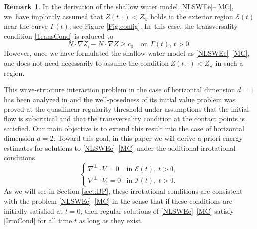 \documentclass[JEP,XML,SOM,Unicode,NoFloatCountersInSection,published]{cedram}
\newcommand{\cI}{{\mathcal I}}
\newcommand{\cE}{{\mathcal E}}
\newcommand{\itGamma}{\mathit{\Gamma}}
\theoremstyle{definition}
\newtheorem{remark}[theorem]{Remark}
\begin{document}
\begin{remark}
In the derivation of the shallow water model \eqref{NLSWEe}--\eqref{MC}, we~have implicitly assumed that $Z(t,\cdot)<Z_\mathrm{w}$ holds in the exterior region
$\cE(t)$ near the curve $\itGamma(t)$; see Figure \ref{Fig:config}. In~this case, the transversality condition \eqref{TransCond} is reduced to
\[
N\cdot\nabla Z_\mathrm{i}-N\cdot\nabla Z \geq c_0 \quad\text{on } \itGamma(t), \ t>0.
\]
However, once we have formulated the shallow water model as \eqref{NLSWEe}--\eqref{MC},
one does not need necessarily to assume the condition $Z(t,\cdot)<Z_\mathrm{w}$ in such a region.
\end{remark}

This wave-structure interaction problem in the case of horizontal dimension $d=1$ has been analyzed in \cite{IguchiLannes2021} and
the well-posedness of its initial value problem was proved at the quasilinear regularity threshold under assumptions that
the initial flow is subcritical and that the transversality condition at the contact points is satisfied.
Our main objective is to extend this result into the case of horizontal dimension $d=2$.
Toward this goal, in this paper we will derive a priori energy estimates for solutions to \eqref{NLSWEe}--\eqref{MC} under the additional irrotational conditions
\begin{equation}\label{IrroCond}
\begin{cases}
\nabla^\perp\cdot V=0 &\text{in } \cE(t), \ t>0, \\
\nabla^\perp\cdot V_\mathrm{i}=0 &\text{in } \cI(t), \ t>0.
\end{cases}
\end{equation}
As we will see in Section \ref{sect:BP}, these irrotational conditions are consistent with the problem \eqref{NLSWEe}--\eqref{MC} in the sense that
if these conditions are initially satisfied at $t=0$, then regular solutions of \eqref{NLSWEe}--\eqref{MC} satisfy \eqref{IrroCond} for all time $t$
as long as they exist.
\end{document}
